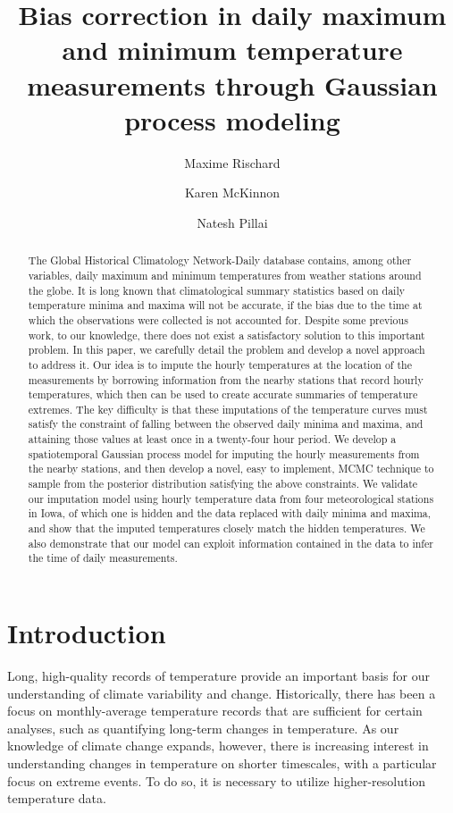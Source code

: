 \documentclass[letter]{article}
\title{
		Bias correction in daily maximum and minimum temperature measurements through Gaussian process modeling
		}
\author[*]{Maxime Rischard}
\author[**]{Karen McKinnon}
\author[*]{Natesh Pillai}
\affil[*]{Department of Statistics, Harvard University}
\affil[**]{National Center for Atmospheric Research}
\begin{document}
    
    
   \maketitle

 \begin{abstract}
The Global Historical Climatology Network-Daily database contains, among other variables, daily maximum and minimum temperatures from weather stations around the globe.
It is long known that climatological summary statistics based on daily temperature minima and maxima will not be accurate, if the bias due to the time at which the observations were collected is not accounted for. Despite some previous work, to our knowledge, there does not exist a satisfactory solution to this important problem.
In this paper, we carefully detail the problem and develop a novel approach to address it. Our idea is to impute the hourly temperatures
at the location of the measurements by borrowing information from the nearby stations that record hourly temperatures, which then can be used to create accurate summaries of temperature extremes.
The key difficulty is that these imputations of the temperature curves must satisfy the constraint of falling between the observed daily minima and maxima, and attaining those values at least once in a twenty-four hour period.
We develop a spatiotemporal Gaussian process model for imputing the hourly measurements from the nearby stations, and then develop a novel, easy to implement, MCMC technique to sample from the posterior distribution satisfying the above constraints. 
We validate our imputation model using hourly temperature data 
from four meteorological stations in Iowa,
of which one is hidden and the data replaced with daily minima and maxima,
and show that the imputed temperatures closely match the hidden temperatures.
We also demonstrate that our model can exploit information contained in the data to infer the time of daily measurements. 

\end{abstract}
    


        \section{Introduction}\label{introduction}
    

Long, high-quality records of temperature provide an important basis for our understanding of climate variability and change. Historically, there has been a focus on monthly-average temperature records that are sufficient for certain analyses, such as quantifying long-term changes in temperature. As our knowledge of climate change expands, however, there is increasing interest in understanding changes in temperature on shorter timescales, with a particular focus on extreme events. To do so, it is necessary to utilize higher-resolution temperature data. 
\end{document}
